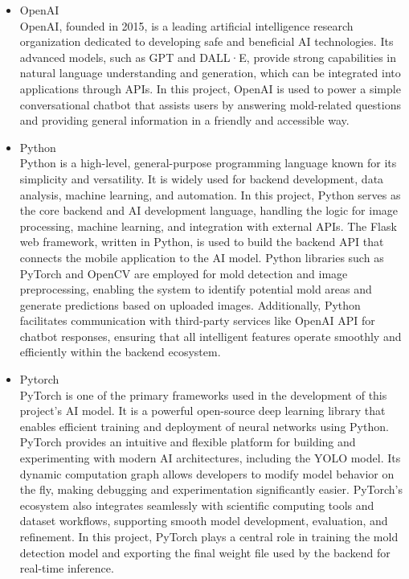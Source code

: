 \documentclass[conference]{IEEEtran}
\begin{document}
\begin{itemize}
        \item OpenAI \\
        OpenAI, founded in 2015, is a leading artificial intelligence research organization dedicated to developing safe and beneficial AI technologies. Its advanced models, such as GPT and DALL·E, provide strong capabilities in natural language understanding and generation, which can be integrated into applications through APIs. In this project, OpenAI is used to power a simple conversational chatbot that assists users by answering mold-related questions and providing general information in a friendly and accessible way. \\
        
        \item Python \\ 
        Python is a high-level, general-purpose programming language known for its simplicity and versatility. It is widely used for backend development, data analysis, machine learning, and automation. In this project, Python serves as the core backend and AI development language, handling the logic for image processing, machine learning, and integration with external APIs. The Flask web framework, written in Python, is used to build the backend API that connects the mobile application to the AI model. Python libraries such as PyTorch and OpenCV are employed for mold detection and image preprocessing, enabling the system to identify potential mold areas and generate predictions based on uploaded images. Additionally, Python facilitates communication with third-party services like OpenAI API for chatbot responses, ensuring that all intelligent features operate smoothly and efficiently within the backend ecosystem. \\
        
        \item Pytorch \\
        PyTorch is one of the primary frameworks used in the development of this project’s AI model. It is a powerful open-source deep learning library that enables efficient training and deployment of neural networks using Python. PyTorch provides an intuitive and flexible platform for building and experimenting with modern AI architectures, including the YOLO model. Its dynamic computation graph allows developers to modify model behavior on the fly, making debugging and experimentation significantly easier. PyTorch’s ecosystem also integrates seamlessly with scientific computing tools and dataset workflows, supporting smooth model development, evaluation, and refinement. In this project, PyTorch plays a central role in training the mold detection model and exporting the final weight file used by the backend for real-time inference. \\


\end{itemize}
\end{document}
